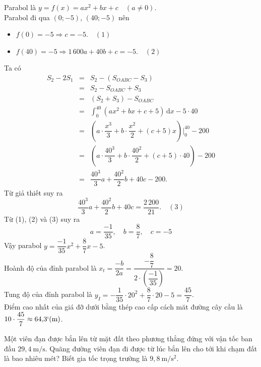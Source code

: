 \begin{bt}
{		Parabol là $y = f(x) = ax^2 + bx + c \quad (a \neq 0)$.\\ 
		Parabol đi qua $(0; -5)$, $(40; -5)$ nên 
		\begin{itemize}
			\item $f(0) = -5 \Rightarrow c = -5.  \quad (1)$
			\item $f(40)  = -5 \Rightarrow 1\,600a + 40b + c = -5. \quad (2)$
		\end{itemize}
		Ta có 
		\begin{eqnarray*}
			S_2 - 2S_1 &=& S_2  - (S_{OABC} - S_3)\\
			&=&  S_2 - S_{OABC} + S_3\\
			&=& (S_2  + S_3) - S_{OABC}\\
			&=& \displaystyle\int_{0}^{40} (ax^2 + bx  + c + 5) \,\mathrm{d}x -5\cdot40\\
			&=& \left( a \cdot \dfrac{x^3}{3} + b \cdot \dfrac{x^2}{2} + (c+5)  x \right) \Bigg|_0^{40} - 200\\
			&=&  \left( a \cdot \dfrac{40^3}{3} + b \cdot \dfrac{40^2}{2} + (c+5) \cdot 40 \right) - 200\\
			&=& \dfrac{40^3}{3} a +  \dfrac{40^2}{2} b + 40c - 200.
		\end{eqnarray*}
		 Từ giả thiết suy ra
		$$ 
		\dfrac{40^3}{3} a + \dfrac{40^2}{2} b + 40c  = \dfrac{2\,200}{21}. \quad (3)
		 $$
		Từ (1), (2) và (3)  suy ra
		$$ 
		a = \dfrac{-1}{35}, \quad b = \dfrac{8}{7}, \quad  c = -5
		 $$
		Vậy parabol $y  = \dfrac{-1}{35} x^2 + \dfrac{8}{7} x - 5$.\\
		 Hoành độ của đỉnh parabol là $x_t = \dfrac{-b}{2a} = \dfrac{-\dfrac{8}{7}}{2 \cdot \left(\dfrac{-1}{35}\right)} = 20$.\\
		Tung độ của đỉnh parabol là $y_I=-\dfrac{1}{35} \cdot 20^2+\dfrac{8}{7} \cdot 20-5=\dfrac{45}{7}$.\\ 
		Điểm cao nhất của giá đỡ dưới bằng thép cao cấp cách măt  đường cây cầu là $10 \cdot \dfrac{45}{7} \approx 64{,}3`(\mathrm{m})$.
	 }
\end{bt}

\begin{bt}%
	Một viên đạn được bắn lên từ mặt đất theo phương thẳng đứng với vận tốc ban đầu  $29{,}4 \mathrm{~m} / \mathrm{s}$. Quãng đường viên đạn đi được từ lúc bắn lên cho tới khi chạm đất là bao nhiêu mét? Biết gia tốc trọng trường là $9{,}8\ \mathrm{m} / \mathrm{s}^2$.
\end{bt}

